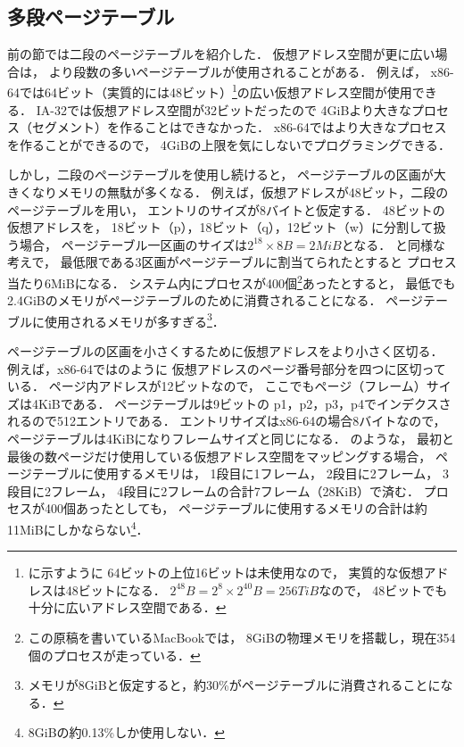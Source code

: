 \subsection{多段ページテーブル}
前の節では二段のページテーブルを紹介した．
仮想アドレス空間が更に広い場合は，
より段数の多いページテーブルが使用されることがある．
例えば，
x86-64では64ビット（実質的には48ビット）\footnote{
  に示すように
  64ビットの上位16ビットは未使用なので，
  実質的な仮想アドレスは48ビットになる．
  $2^{48}B = 2^8 \times 2^{40}B = 256TiB$なので，
  48ビットでも十分に広いアドレス空間である．
}の広い仮想アドレス空間が使用できる．
IA-32では仮想アドレス空間が32ビットだったので
4GiBより大きなプロセス（セグメント）を作ることはできなかった．
x86-64ではより大きなプロセスを作ることができるので，
4GiBの上限を気にしないでプログラミングできる．

しかし，二段のページテーブルを使用し続けると，
ページテーブルの区画が大きくなりメモリの無駄が多くなる．
例えば，仮想アドレスが48ビット，二段のページテーブルを用い，
エントリのサイズが8バイトと仮定する．
48ビットの仮想アドレスを，
18ビット（p），18ビット（q），12ビット（w）に分割して扱う場合，
ページテーブル一区画のサイズは$2^{18} \times 8B = 2MiB$となる．
と同様な考えで，
最低限である3区画がページテーブルに割当てられたとすると
プロセス当たり6MiBになる．
システム内にプロセスが400個\footnote{
  この原稿を書いているMacBookでは，
  8GiBの物理メモリを搭載し，現在354個のプロセスが走っている．
}あったとすると，
最低でも2.4GiBのメモリがページテーブルのために消費されることになる．
ページテーブルに使用されるメモリが多すぎる\footnote{
  メモリが8GiBと仮定すると，約30\%がページテーブルに消費されることになる．
}．

ページテーブルの区画を小さくするために仮想アドレスをより小さく区切る．
例えば，x86-64ではのように
仮想アドレスのページ番号部分を四つに区切っている．
ページ内アドレスが12ビットなので，
ここでもページ（フレーム）サイズは4KiBである．
ページテーブルは9ビットの
p1，p2，p3，p4でインデクスされるので512エントリである．
エントリサイズはx86-64の場合8バイトなので，
ページテーブルは4KiBになりフレームサイズと同じになる．
のような，
最初と最後の数ページだけ使用している仮想アドレス空間をマッピングする場合，
ページテーブルに使用するメモリは，
1段目に1フレーム，
2段目に2フレーム，
3段目に2フレーム，
4段目に2フレームの合計7フレーム（28KiB）で済む．
プロセスが400個あったとしても，
ページテーブルに使用するメモリの合計は約11MiBにしかならない\footnote{
  8GiBの約0.13\%しか使用しない．}．

